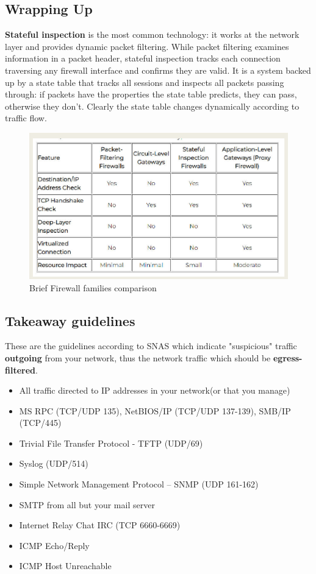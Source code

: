 \subsection{Wrapping Up}
\textbf{Stateful inspection} is the most common technology:
it works at the network layer and provides
dynamic packet filtering.
While packet filtering examines information in a
packet header, stateful inspection tracks each connection traversing any
firewall interface and confirms they are valid.
It is a system backed up by a state table that
tracks all sessions and inspects all packets passing through: 
if packets have
the properties the state table predicts, they can pass, otherwise they don't.
Clearly the state table changes
dynamically according to traffic flow.

\begin{figure}[ht]
   \centering
   \includegraphics{images/firewall_comparison.png}
   \caption{Brief Firewall families comparison}
   \label{fig:firewall_comparison}
\end{figure}

\subsection{Takeaway guidelines}
These are the guidelines according to SNAS which indicate "suspicious" traffic \textbf{outgoing} from your network,
thus the network traffic which should be \textbf{egress-filtered}.
\begin{itemize}
   \item All traffic directed to IP addresses in your network(or that you manage)
   \item MS RPC (TCP/UDP 135), NetBIOS/IP (TCP/UDP 137-139), SMB/IP (TCP/445)
   \item Trivial File Transfer Protocol - TFTP (UDP/69)
   \item Syslog (UDP/514)
   \item Simple Network Management Protocol – SNMP (UDP 161-162)
   \item SMTP from all but your mail server
   \item Internet Relay Chat IRC (TCP 6660-6669)
   \item ICMP Echo/Reply
   \item ICMP Host Unreachable
\end{itemize}

